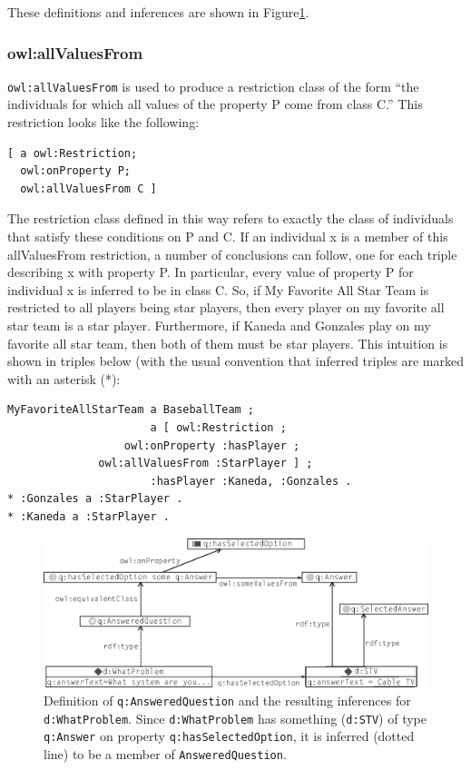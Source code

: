 These definitions and inferences are shown in Figure\ref{fig:ch12.03}.

\subsubsection{owl:allValuesFrom}

\texttt{owl:allValuesFrom} is used to produce a restriction class of the form
``the individuals for which all values of the property P come from class
C.'' This restriction looks like the following:

\begin{lstlisting}
[ a owl:Restriction; 
  owl:onProperty P;
  owl:allValuesFrom C ]
\end{lstlisting}

The restriction class defined in this way refers to exactly the class of
individuals that satisfy these conditions on P and C. If an individual x
is a member of this allValuesFrom restriction, a number of conclusions
can follow, one for each triple describing x with property P. In
particular, every value of property P for individual x is inferred to be
in class C. So, if My Favorite All Star Team is restricted to all players being star players, then every player on my favorite all star team is a star player.  Furthermore, if Kaneda and Gonzales play on my favorite all star team, then both of them must be star players.  This intuition is shown in triples below (with the usual convention that inferred triples are marked with an asterisk (*):

\begin{lstlisting}
MyFavoriteAllStarTeam a BaseballTeam ;
                      a [ owl:Restriction ;
		          owl:onProperty :hasPlayer ;
			  owl:allValuesFrom :StarPlayer ] ;
                      :hasPlayer :Kaneda, :Gonzales .
* :Gonzales a :StarPlayer .
* :Kaneda a :StarPlayer .
\end{lstlisting}



\begin{figure}
\centering
\includegraphics[width=5in]{media/ch12/f12-03.eps}
\caption{Definition of \texttt{q:AnsweredQuestion} and the resulting inferences for
\texttt{d:WhatProblem}. Since \texttt{d:WhatProblem} has something (\texttt{d:STV}) of type
\texttt{q:Answer} on property \texttt{q:hasSelectedOption}, it is inferred (dotted line)
to be a member of \texttt{AnsweredQuestion}.
}
\label{fig:ch12.03}
\end{figure}





